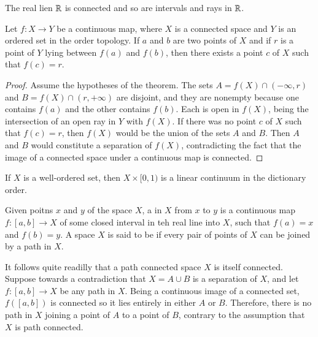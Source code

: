 \documentclass[12pt, a4paper, oneside, openright, titlepage]{book}
\begin{document}
\begin{corollary}
    The real lien $\mathbb R$ is connected and so are intervals and rays in $\mathbb R$.
\end{corollary}


\begin{theorem}\label{thmname:intvalgen}
    Let $f:X\rightarrow Y$ be a continuous map, where $X$ is a connected space and $Y$ is an ordered set in the order topology. If $a$ and $b$ are two points of $X$ and if $r$ is a point of $Y$ lying between $f(a)$ and $f(b)$, then there exists a point $c$ of $X$ such that $f(c) = r$.
\end{theorem}
\begin{proof}
    Assume the hypotheses of the theorem. The sets $A = f(X)\cap (-\infty, r)$ and $B = f(X)\cap(r,+\infty)$ are disjoint, and they are nonempty because one contains $f(a)$ and the other contains $f(b)$. Each is open in $f(X)$, being the intersection of an open ray in $Y$ with $f(X)$. If there was no point $c$ of $X$ such that $f(c) = r$, then $f(X)$ would be the union of the sets $A$ and $B$. Then $A$ and $B$ would constitute a separation of $f(X)$, contradicting the fact that the image of a connected space under a continuous map is connected.
\end{proof}

\begin{example}
    If $X$ is a well-ordered set, then $X\times [0,1)$ is a linear continuum in the dictionary order.
\end{example}

\begin{definition}
    Given poitns $x$ and $y$ of the space $X$, a  in $X$ from $x$ to $y$ is a continuous map $f:[a,b]\rightarrow X$ of some closed interval in teh real line into $X$, such that $f(a) = x$ and $f(b) = y$. A space $X$ is said to be  if every pair of points of $X$ can be joined by a path in $X$.
\end{definition}

It follows quite readilly that a path connected space $X$ is itself connected. Suppose towards a contradiction that $X = A\cup B$ is a separation of $X$, and let $f:[a,b]\rightarrow X$ be any path in $X$. Being a continuous image of a connected set, $f([a,b])$ is connected so it lies entirely in either $A$ or $B$. Therefore, there is no path in $X$ joining a point of $A$ to a point of $B$, contrary to the assumption that $X$ is path connected.
\end{document}
